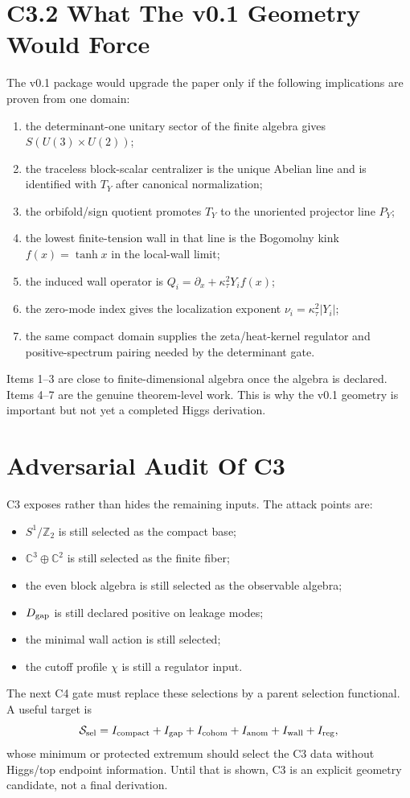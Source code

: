 \documentclass[11pt]{article}
\begin{document}
\section{C3.2 What The v0.1 Geometry Would Force}
The v0.1 package would upgrade the paper only if the following implications
are proven from one domain:
\begin{enumerate}
\item the determinant-one unitary sector of the finite algebra gives
$S(U(3)\times U(2))$;
\item the traceless block-scalar centralizer is the unique Abelian line and is
identified with $T_Y$ after canonical normalization;
\item the orbifold/sign quotient promotes $T_Y$ to the unoriented projector
line $P_Y$;
\item the lowest finite-tension wall in that line is the Bogomolny kink
$f(x)=\tanh x$ in the local-wall limit;
\item the induced wall operator is $Q_i=\partial_x+\kappa_\tau^2Y_if(x)$;
\item the zero-mode index gives the localization exponent
$\nu_i=\kappa_\tau^2|Y_i|$;
\item the same compact domain supplies the zeta/heat-kernel regulator and
positive-spectrum pairing needed by the determinant gate.
\end{enumerate}
Items 1--3 are close to finite-dimensional algebra once the algebra is
declared.  Items 4--7 are the genuine theorem-level work.  This is why the
v0.1 geometry is important but not yet a completed Higgs derivation.

\section{Adversarial Audit Of C3}
C3 exposes rather than hides the remaining inputs.  The attack points are:
\begin{itemize}
\item $S^1/\mathbb Z_2$ is still selected as the compact base;
\item $\mathbb C^3\oplus\mathbb C^2$ is still selected as the finite fiber;
\item the even block algebra is still selected as the observable algebra;
\item $D_{\rm gap}$ is still declared positive on leakage modes;
\item the minimal wall action is still selected;
\item the cutoff profile $\chi$ is still a regulator input.
\end{itemize}
The next C4 gate must replace these selections by a parent selection
functional.  A useful target is
\begin{equation}
{\cal S}_{\rm sel}=
I_{\rm compact}+I_{\rm gap}+I_{\rm cohom}+I_{\rm anom}+I_{\rm wall}+I_{\rm reg},
\end{equation}
whose minimum or protected extremum should select the C3 data without Higgs/top
endpoint information.  Until that is shown, C3 is an explicit geometry
candidate, not a final derivation.
\end{document}
